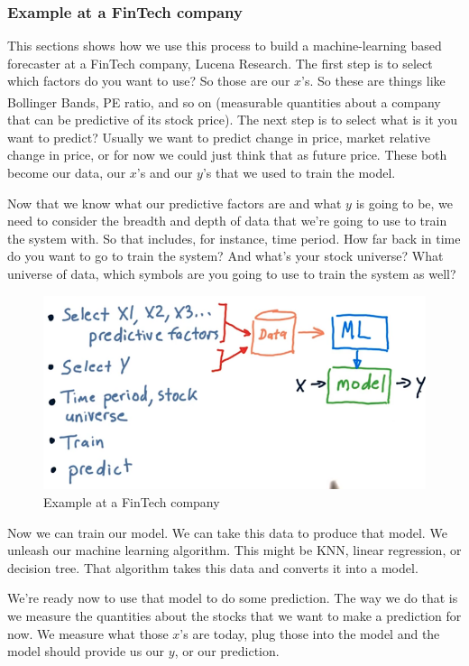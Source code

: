 \documentclass[12pt]{article}
\begin{document}
\subsubsection{Example at a FinTech company}

This sections shows how we use this process to build a machine-learning based forecaster at a FinTech company, Lucena Research. The first step is to select which factors do you want to use? So those are our $x$'s. So these are things like Bollinger Bands\textsuperscript\textregistered, PE ratio, and so on (measurable quantities about a company that can be predictive of its stock price). The next step is to select what is it you want to predict? Usually we want to predict change in price, market relative change in price, or for now we could just think that as future price. These both become our data, our $x$'s and our $y$'s that we used to train the model. 

Now that we know what our predictive factors are and what $y$ is going to be, we need to consider the breadth and depth of data that we're going to use to train the system with. So that includes, for instance, time period. How far back in time do you want to go to train the system? And what's your stock universe? What universe of data, which symbols are you going to use to train the system as well?

\begin{figure}[!ht]
\centering
\includegraphics[scale=0.45]{fig/fig74}
\caption{Example at a FinTech company}
\end{figure}

Now we can train our model. We can take this data to produce that model. We unleash our machine learning algorithm. This might be KNN, linear regression, or decision tree. That algorithm takes this data and converts it into a model. 

We're ready now to use that model to do some prediction. The way we do that is we measure the quantities about the stocks that we want to make a prediction for now. We measure what those $x$'s are today, plug those into the model and the model should provide us our $y$, or our prediction. 
\end{document}
